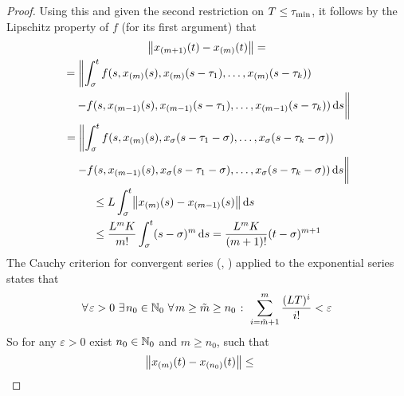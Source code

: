 \begin{proof}
        Using this and given the second restriction on $T\leq\tau_{\min}$, it follows by the Lipschitz property of $f$ (for its first argument) that
        \begin{multline*}
            \nnorm*{x_{(m+1)}(t)-x_{(m)}(t)} =\\
            \!\begin{multlined}[t][0.8\displaywidth]
                = \left\lVert\integral{\tzero}{t} f(s,x_{(m)}(s),x_{(m)}(s-\tau_1),\ldots,x_{(m)}(s-\tau_k))\right.\\
                \left.- f(s,x_{(m-1)}(s),x_{(m-1)}(s-\tau_1),\ldots,x_{(m-1)}(s-\tau_k))\dx[s]
                \vphantom{\integral{\tzero}{t}}\right\rVert
            \end{multlined}\\
            \!\begin{multlined}[t][0.8\displaywidth]
                = \left\lVert\integral{\tzero}{t} f(s,x_{(m)}(s),x_{\tzero}(s-\tau_1-\tzero),\ldots,x_{\tzero}(s-\tau_k-\tzero))\right.\\
                \left.- f(s,x_{(m-1)}(s),x_{\tzero}(s-\tau_1-\tzero),\ldots,x_{\tzero}(s-\tau_k-\tzero))\dx[s]
                \vphantom{\integral{\tzero}{t}}\right\rVert
            \end{multlined}\\
            \begin{aligned}   
            &\leq L \integral{\tzero}{t} \nnorm*{x_{(m)}(s) - x_{(m-1)}(s)}\dx[s]\\
            &\leq \frac{L^m K}{m!} \integral{\tzero}{t} (s-\tzero)^m\dx[s]
            = \frac{L^m K}{(m+1)!}(t-\tzero)^{m+1}
            \end{aligned}
        \end{multline*}
        The Cauchy criterion for convergent series (\cite[Theorem~6.13]{Gathmann12GDM}, \cite[Theorem~3.22]{Rudin76PrinciplesAnalysis}) applied to the exponential series states that
        \begin{equation*}
            \forall\mkern2mu \varepsilon>0\ \exists\mkern2mu n_0\in\mathbb{N}_0\ \forall\mkern2mu m\geq \tilde{m}\geq n_0\mathrel{\colon} \sum_{i=\tilde{m}+1}^m \frac{(LT)^i}{i!} <\varepsilon
        \end{equation*}
        So for any $\varepsilon>0$ exist $n_0\in\mathbb{N}_0$ and $m\geq n_0$, such that
        \begin{align*}
            \nnorm*{x_{(m)}(t)-x_{(n_0)}(t)}
            &\leq \!\begin{multlined}[t][0.55\displaywidth]

\end{multlined}
\end{align*}
\end{proof}
